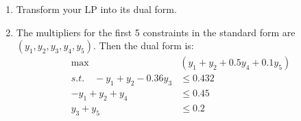 \documentclass[12pt,a4paper]{article}
\makeatletter
\newtheorem*{solution}{Solution}
\theoremstyle{definition}
\renewenvironment{solution}[1][Solution] {\par\pushQED{\qed}\normalfont\topsep6\p@\@plus6\p@\relax\trivlist\item[\hskip\labelsep\bfseries#1\@addpunct{.}]\ignorespaces}{\popQED\endtrivlist\@endpefalse} \makeatother
\makeatother
\begin{document}
\begin{enumerate}
\begin{enumerate}
    \item
    Transform your LP into its dual form.
    \begin{solution}
      The multipliers for the first 5 constraints in the standard form are $(y_1,y_2,y_3,y_4,y_5)$. Then the dual form is:
      \begin{align*}
        \max &(y_1+y_2+0.5y_4+0.1y_5)\\
        s.t.\quad -y_1+y_2-0.36y_3&\leq 0.432\\
          -y_1+y_2+y_4&\leq 0.45\\
          y_3+y_5&\leq0.2  
      \end{align*}
    \end{solution}

\end{enumerate}
\end{enumerate}
\end{document}
